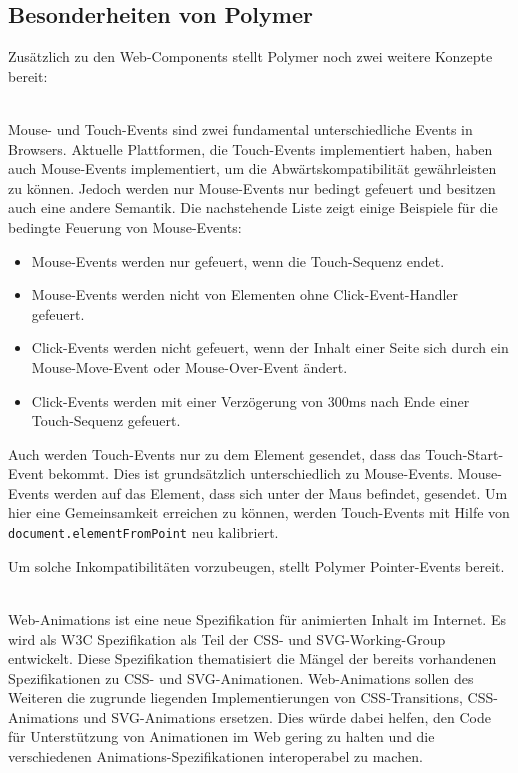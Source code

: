 \subsection{Besonderheiten von Polymer}
\label{sec:4_Polymer_Besonderheiten}

Zusätzlich zu den Web-Components stellt Polymer noch zwei weitere Konzepte bereit:
\begin{enumerate}
 \hfill \\
Mouse- und Touch-Events sind zwei fundamental unterschiedliche Events in Browsers. Aktuelle Plattformen, die Touch-Events implementiert haben, haben auch Mouse-Events implementiert, um die Abwärtskompatibilität gewährleisten zu können. Jedoch werden nur Mouse-Events nur bedingt gefeuert und besitzen auch eine andere Semantik. Die nachstehende Liste zeigt einige Beispiele für die bedingte Feuerung von Mouse-Events:
\begin{itemize}
\item Mouse-Events werden nur gefeuert, wenn die Touch-Sequenz endet.
\item Mouse-Events werden nicht von Elementen ohne Click-Event-Handler gefeuert.
\item Click-Events werden nicht gefeuert, wenn der Inhalt einer Seite sich durch ein Mouse-Move-Event oder Mouse-Over-Event ändert.
\item Click-Events werden mit einer Verzögerung von 300ms nach Ende einer Touch-Sequenz gefeuert.
\end{itemize}

Auch werden Touch-Events nur zu dem Element gesendet, dass das Touch-Start-Event bekommt. Dies ist grundsätzlich unterschiedlich zu Mouse-Events. Mouse-Events werden auf das Element, dass sich unter der Maus befindet, gesendet. Um hier eine Gemeinsamkeit erreichen zu können, werden Touch-Events mit Hilfe von \lstinline|document.elementFromPoint| neu kalibriert.

Um solche Inkompatibilitäten vorzubeugen, stellt Polymer Pointer-Events bereit.

 \hfill \\
Web-Animations ist eine neue Spezifikation für animierten Inhalt im Internet. Es wird als W3C Spezifikation als Teil der CSS- und SVG-Working-Group entwickelt. Diese Spezifikation thematisiert die Mängel der bereits vorhandenen Spezifikationen zu CSS- und SVG-Animationen. Web-Animations sollen des Weiteren die zugrunde liegenden Implementierungen von CSS-Transitions, CSS-Animations und SVG-Animations ersetzen. Dies würde dabei helfen, den Code für Unterstützung von Animationen im Web gering zu halten und die verschiedenen Animations-Spezifikationen interoperabel zu machen.
\end{enumerate}

